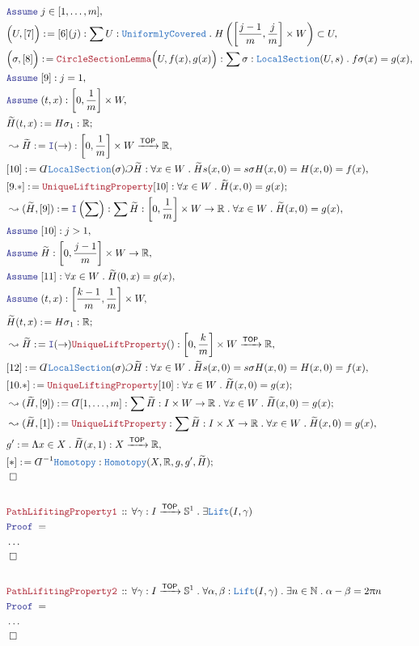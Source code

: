 \documentclass[12pt]{scrartcl}
\newcommand{\TYPE}[1]{\textcolor{NavyBlue}{\mathtt{#1}}}
\newcommand{\LOGIC}[1]{\textcolor{Blue}{\mathtt{#1}}}
\newcommand{\THM}[1]{\textcolor{Maroon}{\mathtt{#1}}}
\renewcommand{\.}{\; . \;}
\newcommand{\de}{: \kern 0.1pc =}
\newcommand{\Act}[1]{\left( #1 \right)}
\newcommand{\Theorem}[2]{& \THM{#1} \, :: \, #2 \\ & \Proof = \\ }
\newcommand{\Page}[1]{ \begin{align*} #1 \end{align*}   }
\newcommand{ \bd }{ \ByDef }
\newcommand{\NoProof}{ & \ldots \\ \EndProof}
\newcommand{\Intro}{\LOGIC{I}}
\newcommand{\Reals}{\mathbb{R} }
\newcommand{\Sphere}{\mathbb{S}}
\newcommand{\Nat}{\mathbb{N} }
\newcommand{\Arrow}{\xrightarrow}
\newcommand{\Say}[3]{& #1 \de #2 : #3, \\}
\newcommand{\Conclude}[3]{& #1 \de #2 : #3; \\}
\newcommand{\Derive}[3]{& \leadsto #1 \de #2 : #3, \\}
\newcommand{\DeriveConclude}[3]{& \leadsto #1 \de #2 : #3 ; \\}
\newcommand{\Assume}[2]{& \LOGIC{Assume} \; #1 : #2, \\}
\newcommand{\AssumeIn}[2]{& \LOGIC{Assume} \; #1 \in #2, \\}
\newcommand{\QED}{\; \square}
\newcommand{\EndProof}{& \QED \\}
\newcommand{\ByDef}{\rotatebox[origin=c]{-180}{$D$}}%
\newcommand{\ByConstr}{\rotatebox[origin=c]{-180}{$C$}}%
\newcommand{\Proof}{\LOGIC{Proof} \; }
\newcommand{\TOP}{\mathsf{TOP}}
\begin{document}
\Page{
	\AssumeIn{j}{[1,\ldots,m]}
	\Say{\Big(U,[7]\Big)}{[6](j)}
	{
		\sum U : \TYPE{UniformlyCovered} \. 
		H\left( \left[ \frac{j-1}{m},\frac{j}{m} \right] \times W \right) \subset U
	}
	\Say{\Big(\sigma,[8]\Big)}
	{
		\THM{CircleSectionLemma}\Big(U,f(x),g(x)\Big)
	}
	{
		\sum \sigma : \TYPE{LocalSection}(U,s) \. f \sigma (x) = g(x)
	}
	\Assume{[9]}{j=1}
	\Assume{(t,x)}{\left[0,\frac{1}{m}\right] \times W}
	\Conclude{\widetilde{H}(t,x)}{H \sigma_1}{\Reals}
	\Derive{\widetilde{H}}{\Intro(\to)}{\left[0,\frac{1}{m}\right] \times W \Arrow{\TOP} \Reals}
	\Say{[10]}{\bd \TYPE{LocalSection}(\sigma)\ByConstr \widetilde{H}}
	{
		\forall x \in W \.  \widetilde{H} s (x,0) =  s \sigma H(x,0) = H(x,0) = f(x)
	}
	\Conclude{[9.*]}{\THM{UniqueLiftingProperty}[10]}
	{
		\forall x \in W \. \widetilde{H}(x,0) = g(x)
	}
	\Derive{(\widetilde{H},[9])}{\Intro\Act{\sum}}
	{
		\sum \widetilde{H} : \left[0,\frac{1}{m}\right] \times W \to \Reals \.
		\forall x \in W \. \widetilde{H}(x,0) = g(x)
	}
	\Assume{[10]}{j > 1}
	\Assume{\widetilde{H}}{\left[0,\frac{j-1}{m}\right] \times W \to \Reals}
	\Assume{[11]}{ \forall x \in W \. \widetilde{H}(0,x) = g(x)   }
	\Assume{(t,x)}{\left[\frac{k-1}{m},\frac{1}{m}\right] \times W}
	\Conclude{\widetilde{H}(t,x)}{H \sigma_1}{\Reals}
	\Derive{\widetilde{H}}{\Intro(\to)\THM{UniqueLiftProperty}()}{\left[0,\frac{k}{m}\right] \times W \Arrow{\TOP} \Reals}
	\Say{[12]}{\bd \TYPE{LocalSection}(\sigma)\ByConstr \widetilde{H}}
	{
		\forall x \in W \.  \widetilde{H} s (x,0) =  s \sigma H(x,0) = H(x,0) = f(x)
	}
	\Conclude{[10.*]}{\THM{UniqueLiftingProperty}[10]}
	{
		\forall x \in W \. \widetilde{H}(x,0) = g(x)
	}
	\DeriveConclude{(\widetilde{H},[9])}{\bd [1,\ldots,m]}
	{
		\sum \widetilde{H} : I \times W \to \Reals \.
		\forall x \in W \. \widetilde{H}(x,0) = g(x)
	}
	\Derive{(\widetilde{H},[1])}{\THM{UniqueLiftProperty}}
	{
		\sum \widetilde{H} : I \times X \to \Reals \.
		\forall x \in W \. \widetilde{H}(x,0) = g(x)
	}
	\Say{g'}{\Lambda x \in X \. \widetilde{H}(x,1)}{X \Arrow{\TOP} \Reals}
	\Conclude{[*]}{\bd^{-1}\TYPE{Homotopy}}
	{
		\TYPE{Homotopy}(X,\Reals,g,g',\widetilde{H})
	}
	\EndProof
	\\
	\Theorem{PathLifitingProperty1}
	{
		\forall \gamma : I \Arrow{\TOP} \Sphere^1 \.
		\exists \TYPE{Lift}(I,\gamma)
	}
	\NoProof
	\\
	\Theorem{PathLifitingProperty2}
	{
		\forall \gamma : I \Arrow{\TOP} \Sphere^1 \.
		\forall \alpha, \beta :  \TYPE{Lift}(I,\gamma) \.
		\exists n \in \Nat \.
		\alpha - \beta = 2\uppi n
	}
	\NoProof
}
\end{document}
